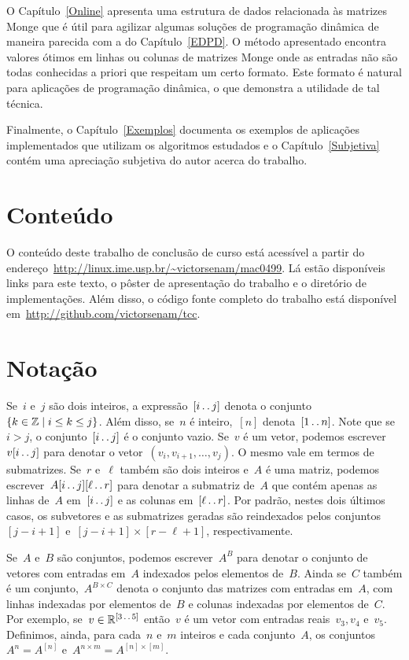 O Capítulo~\ref{Online} apresenta uma estrutura de dados relacionada às matrizes Monge que é útil para agilizar algumas soluções de programação dinâmica de maneira parecida com a do Capítulo~\ref{EDPD}. O método apresentado encontra valores ótimos em linhas ou colunas de matrizes Monge onde as entradas não são todas conhecidas a priori que respeitam um certo formato. Este formato é natural para aplicações de programação dinâmica, o que demonstra a utilidade de tal técnica.

Finalmente, o Capítulo~\ref{Exemplos} documenta os exemplos de aplicações implementados que utilizam os algoritmos estudados e o Capítulo~\ref{Subjetiva} contém uma apreciação subjetiva do autor acerca do trabalho.

\section{Conteúdo}
O conteúdo deste trabalho de conclusão de curso está acessível a partir do endereço~\href{http://linux.ime.usp.br/~victorsenam/mac0499}{http://linux.ime.usp.br/\textasciitilde{}victorsenam/mac0499}. Lá estão disponíveis links para este texto, o pôster de apresentação do trabalho e o diretório de implementações. Além disso, o código fonte completo do trabalho está disponível em~\href{http://github.com/victorsenam/tcc}{http://github.com/victorsenam/tcc}.

\section{Notação}
Se~$i$ e~$j$ são dois inteiros, a expressão~$[i \,.\,.\, j]$ denota o conjunto~${ \{ k \in \mathbb{Z} \mid i \leq k \leq j \} }$. Além disso, se~$n$ é inteiro,~$[n]$ denota~$[1 \,.\,.\, n]$. Note que se~$i > j$, o conjunto~$[i \,.\,.\, j]$ é o conjunto vazio. Se~$v$ é um vetor, podemos escrever~$v[i \,.\,.\, j]$ para denotar o vetor~${ (v_i, v_{i+1}, \dots, v_j) }$. O mesmo vale em termos de submatrizes. Se~$r$ e~$\ell$ também são dois inteiros e~$A$ é uma matriz, podemos escrever~$A[i \,.\,.\, j][\ell \,.\,.\, r]$ para denotar a submatriz de~$A$ que contém apenas as linhas de~$A$ em~$[i \,.\,.\, j]$ e as colunas em~$[\ell \,.\,.\, r]$. Por padrão, nestes dois últimos casos, os subvetores e as submatrizes geradas são reindexados pelos conjuntos~$[j - i + 1]$ e~${ [j - i + 1] \times [r - \ell + 1] }$, respectivamente.

Se~$A$ e~$B$ são conjuntos, podemos escrever~$A^B$ para denotar o conjunto de vetores com entradas em~$A$ indexados pelos elementos de~$B$. Ainda se~$C$ também é um conjunto,~$A^{B \times C}$ denota o conjunto das matrizes com entradas em~$A$, com linhas indexadas por elementos de~$B$ e colunas indexadas por elementos de~$C$. Por exemplo, se~$v \in \mathbb{R}^{ [3 \,.\,.\, 5] }$ então~$v$ é um vetor com entradas reais~${ v_3, v_4 }$ e~$v_5$. Definimos, ainda, para cada~$n$ e~$m$ inteiros e cada conjunto~$A$, os conjuntos~${ A^n = A^{ [n] } }$ e~${ A^{n \times m} = A^{[n] \times [m]} }$.

